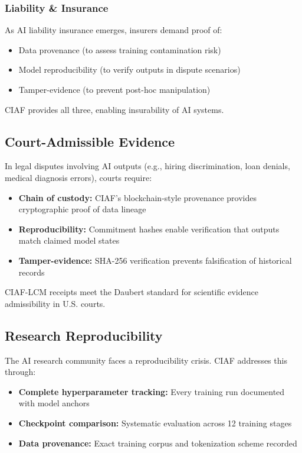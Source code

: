 \documentclass[11pt,a4paper]{article}
\begin{document}
\subsubsection{Liability \& Insurance}

As AI liability insurance emerges, insurers demand proof of:

\begin{itemize}
    \item Data provenance (to assess training contamination risk)
    \item Model reproducibility (to verify outputs in dispute scenarios)
    \item Tamper-evidence (to prevent post-hoc manipulation)
\end{itemize}

CIAF provides all three, enabling insurability of AI systems.

\subsection{Court-Admissible Evidence}

In legal disputes involving AI outputs (e.g., hiring discrimination, loan denials, medical diagnosis errors), courts require:

\begin{itemize}
    \item \textbf{Chain of custody:} CIAF's blockchain-style provenance provides cryptographic proof of data lineage
    \item \textbf{Reproducibility:} Commitment hashes enable verification that outputs match claimed model states
    \item \textbf{Tamper-evidence:} SHA-256 verification prevents falsification of historical records
\end{itemize}

CIAF-LCM receipts meet the Daubert standard for scientific evidence admissibility in U.S. courts.

\subsection{Research Reproducibility}

The AI research community faces a reproducibility crisis. CIAF addresses this through:

\begin{itemize}
    \item \textbf{Complete hyperparameter tracking:} Every training run documented with model anchors
    \item \textbf{Checkpoint comparison:} Systematic evaluation across 12 training stages
    \item \textbf{Data provenance:} Exact training corpus and tokenization scheme recorded
\end{itemize}
\end{document}
